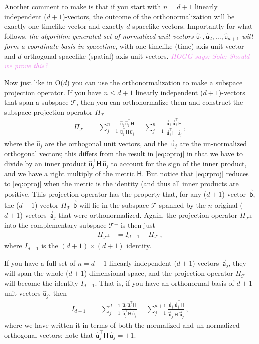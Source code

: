 \documentclass{article}
\newcommand{\metric}{\mathsf{H}}
\newcommand{\proj}{\mathsf{\Pi}}
\newcommand\upvec[1]{\!\vec{\,\mathrm{#1}}}
\newcommand{\Lvec}[1]{\upvec{\mathsf{#1}}} %
\newcommand{\Lhat}[1]{\hat{\mathsf{#1}}} %
\newcommand{\plus}{\!+\!} %
\newcommand{\HOGG}[1]{\textcolor{violet}{\textsl{HOGG says: {#1}}}}
\begin{document}
Another comment to make is that if you start with $n=d+1$ linearly independent ($d\plus1$)-vectors, the outcome of the orthonormalization will be exactly one timelike vector and exactly $d$ spacelike vectors.
Importantly for what follows, \emph{the algorithm-generated set of normalized unit vectors $\Lhat{u}_1,\Lhat{u}_2,\ldots,\Lhat{u}_{d+1}$ will form a coordinate basis in spacetime}, with one timelike (time) axis unit vector and $d$ orthogonal spacelike (spatial) axis unit vectors.
\HOGG{Sole: Should we prove this?}

Now just like in O($d$) you can use the orthonormalization to make a subspace projection operator.
If you have $n\leq d+1$ linearly independent ($d\plus1$)-vectors that span a subspace $\mathscr{T}$, then you can orthonormalize them and construct the subspace projection operator $\proj_\mathscr{T}$
\begin{align}\label{eq:rproj}
    \proj_\mathscr{T} &= \sum_{j=1}^n \frac{\Lhat{u}_j\,\Lhat{u}_j^\top\metric}{\Lhat{u}_j^\top\metric\,\Lhat{u}_j} = \sum_{j=1}^n \frac{\Lvec{u}_j\,\Lvec{u}_j^\top\metric}{\Lvec{u}_j^\top\metric\,\Lvec{u}_j} ~,
\end{align}
where the $\Lhat{u}_j$ are the orthogonal unit vectors, and the $\Lvec{u}_j$ are the un-normalized orthogonal vectors; this differs from the result in \eqref{eq:oproj} in that we have to divide by an inner product $\Lhat{u}_j^\top\metric\,\Lhat{u}_j$ to account for the sign of the inner product, and we have a right multiply of the metric $\metric$.
But notice that \eqref{eq:rproj} reduces to \eqref{eq:oproj} when the metric is the identity (and thus all inner products are positive.
This projection operator has the property that, for any ($d\plus1$)-vector $\Lvec{b}$, the ($d\plus1$)-vector $\proj_\mathscr{T}\,\Lvec{b}$ will lie in the subspace $\mathscr{T}$ spanned by the $n$ original ($d\plus1$)-vectors $\Lvec{a}_j$ that were orthonormalized.
Again, the projection operator $\proj_{\mathscr{T}^\perp}$ into the complementary subspace $\mathscr{T}^\perp$ is then just
\begin{align}\label{eq:lprojcomp}
    \proj_{\mathscr{T}^\perp} &= I_{d+1} - \proj_\mathscr{T} ~,
\end{align}
where $I_{d+1}$ is the $(d+1)\times(d+1)$ identity.

If you have a full set of $n=d+1$ linearly independent ($d\plus1$)-vectors $\Lvec{a}_j$, they will span the whole ($d\plus1$)-dimensional space, and the projection operator $\proj_\mathscr{T}$ will become the identity $I_{d+1}$.
That is, if you have an orthonormal basis of $d+1$ unit vectors $\Lhat{u}_j$, then
\begin{align}
    I_{d+1} &= \sum_{j=1}^{d+1} \frac{\Lhat{u}_j\,\Lhat{u}_j^\top\metric}{\Lhat{u}_j^\top\metric\,\Lhat{u}_j} = \sum_{j=1}^{d+1} \frac{\Lvec{u}_j\,\Lvec{u}_j^\top\metric}{\Lvec{u}_j^\top\metric\,\Lvec{u}_j} \label{eq:Lidentity} ~,
\end{align}
where we have written it in terms of both the normalized and un-normalized orthogonal vectors; note that $\Lhat{u}_j^\top\metric\,\Lhat{u}_j=\pm 1$.
\end{document}
